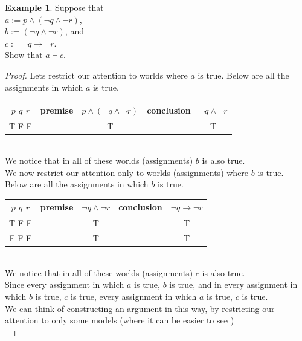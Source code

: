 \documentclass[letterpaper,10pt]{article}
\theoremstyle{plain}
\theoremstyle{definition}
\newtheorem{exmp}[thm]{Example}
\theoremstyle{remark}
\providecommand{\land}{\ensuremath{\wedge}}
\begin{document}
\begin{exmp}
Suppose that \\
$a :=p\land (\lnot q \land \lnot r)$,\\
$b:= (\lnot q \land \lnot r)$, and \\
$c:=\lnot q \to \lnot r$.\\
Show that
$a\vdash c$.
\begin{proof}
Lets restrict our attention to worlds where $a$ is true. Below are all the assignments in which $a$ is true.\\
\begin{tabular}{ | c | c | c |c |c |} 
  \hline
 $p$ $q$ $r$ & premise & $p \land (\lnot q \land \lnot r)$& conclusion & $\lnot q \land \lnot r$\\
 \hline
  T F F  &&T &&T\\ 
 \hline
\end{tabular}\\
We notice that in all of these worlds (assignments) $b$ is also true.\\
We now restrict our attention only to worlds (assignments) where $b$ is true.\\
Below are all the assignments in which $b$ is true.\\
\begin{tabular}{ | c | c | c |c |c |} 
  \hline
 $p$ $q$ $r$ & premise & $\lnot q \land \lnot r$& conclusion & $\lnot q \to \lnot r$\\
 \hline
  T F F  &&T &&T\\
  F F F  &&T &&T\\ 
 \hline
\end{tabular}\\
We notice that in all of these worlds (assignments) $c$ is also true.\\
Since every assignment in which $a$ is true, $b$ is true, and in every assignment in which $b$ is true, $c$ is true, every assignment in which $a$ is true, $c$ is true.\\
We can think of constructing an argument in this way, by restricting our attention to only some models (where it can be easier to see )\\


\end{proof}
\end{exmp}
\end{document}
